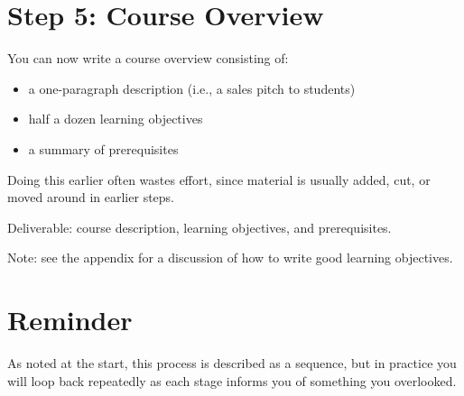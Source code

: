 \section*{Step 5: Course Overview}

You can now write a course overview consisting of:

\begin{itemize}
\item
  a one-paragraph description (i.e., a sales pitch to students)
\item
  half a dozen learning objectives
\item
  a summary of prerequisites
\end{itemize}

Doing this earlier often wastes effort, since material is usually added,
cut, or moved around in earlier steps.

Deliverable: course description, learning objectives, and prerequisites.

Note: see the appendix for a discussion of how to write good learning
objectives.

\section*{Reminder}

As noted at the start, this process is described as a sequence, but in
practice you will loop back repeatedly as each stage informs you of
something you overlooked.
